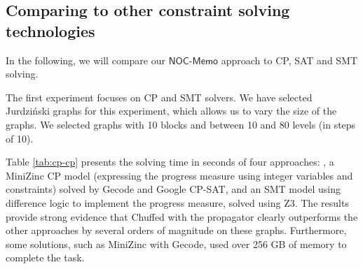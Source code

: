 \documentclass[a4paper,UKenglish,cleveref, autoref, thm-restate, anonymous]{lipics-v2021}
\begin{document}
\subsection{Comparing \protect\noc to other constraint solving technologies}

In the following, we will compare our $\mathsf{NOC\textit{-}Memo}$ approach to CP, SAT and SMT solving.

The first experiment focuses on CP and SMT solvers. We have selected Jurdziński graphs for this experiment, which allows us to vary the size of the graphs. We selected graphs with 10 blocks and between 10 and 80 levels (in steps of 10).

Table \ref{tab:cp-cp} presents the solving time in seconds of four approaches: \noc, a MiniZinc CP model (expressing the progress measure using integer variables and constraints) solved by Gecode and Google CP-SAT, and an SMT model using difference logic to implement the progress measure, solved using Z3. The results provide strong evidence that Chuffed with the \noc propagator clearly outperforms the other approaches by several orders of magnitude on these graphs. Furthermore, some solutions, such as MiniZinc with Gecode, used over 256 GB of memory to complete the task.
\end{document}
